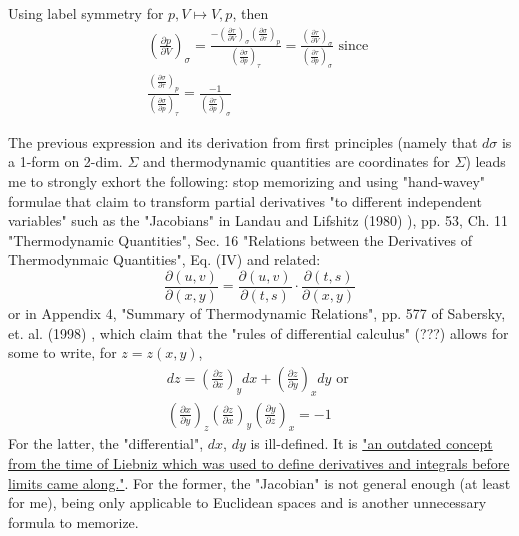 \documentclass[twoside,landscape,10pt]{amsart}
\theoremstyle{plain}
\theoremstyle{definition}
\theoremstyle{remark}
\theoremstyle{remark}
\begin{document}
\begin{multicols*}{2}
Using label symmetry for $p, V \mapsto V, p$, then
\[
\begin{gathered}
\left( \frac{\partial p}{\partial V} \right)_{\sigma} =  \frac{ - \left( \frac{\partial \tau}{\partial V} \right)_{\sigma} \left( \frac{\partial \sigma}{\partial \tau}\right)_p }{ \left( \frac{\partial \sigma}{\partial p}\right)_{\tau} } = \frac{ \left( \frac{\partial \tau }{\partial V} \right)_{\sigma} }{ \left( \frac{\partial \tau}{\partial p} \right)_{\sigma} } \text{ since } \\
\frac{ \left( \frac{\partial \sigma}{\partial \tau}\right)_p }{ \left( \frac{\partial \sigma}{\partial p}\right)_{\tau} } = \frac{-1}{ \left( \frac{\partial \tau}{\partial p} \right)_{\sigma} }
\end{gathered}
\]

The previous expression and its derivation from first principles (namely that $d\sigma$ is a 1-form on 2-dim. $\Sigma$ and thermodynamic quantities are coordinates for $\Sigma$) leads me to strongly exhort the following: stop memorizing and using "hand-wavey" formulae that claim to transform partial derivatives "to different independent variables" such as the "Jacobians" in Landau and Lifshitz (1980) \cite{LLandauELifshitz1980}), pp. 53, Ch. 11 "Thermodynamic Quantities", Sec. 16 "Relations between the Derivatives of Thermodynmaic Quantities", Eq. (IV) and related:
\[
\frac{ \partial (u,v)}{ \partial (x,y)} = \frac{ \partial (u,v) }{ \partial (t,s)} \cdot \frac{\partial (t,s) }{ \partial (x,y) }
\]
or in Appendix 4, "Summary of Thermodynamic Relations", pp. 577 of Sabersky, et. al. (1998) \cite{SAHG1998}, which claim that the "rules of differential calculus" (???) allows for some to write, for $z = z(x,y)$, 
\[
\begin{gathered} 
dz = \left( \frac{ \partial z}{ \partial x} \right)_y dx + \left( \frac{ \partial z}{ \partial y} \right)_x dy \text{ or } \\
\left( \frac{ \partial x }{ \partial y} \right)_z \left( \frac{ \partial z }{ \partial x} \right)_y \left( \frac{ \partial y}{ \partial z }\right)_x = -1
\end{gathered}
\]
For the latter, the "differential", $dx$, $dy$ is ill-defined. It is \href{https://math.stackexchange.com/questions/2101896/what-is-the-meaning-of-a-differential-in-terms-of-an-exact-differential}{"an outdated concept from the time of Liebniz which was used to define derivatives and integrals before limits came along."}. For the former, the "Jacobian" is not general enough (at least for me), being only applicable to Euclidean spaces and is another unnecessary formula to memorize.


\end{multicols*}
\end{document}
